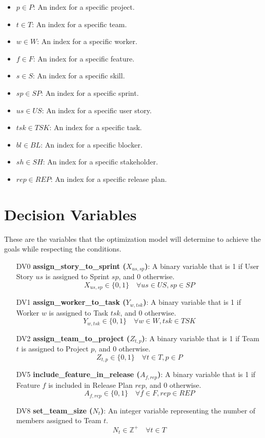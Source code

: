 \documentclass[11pt]{article}
\begin{document}
\begin{itemize}
    \item $p \in P$: An index for a specific project.
    \item $t \in T$: An index for a specific team.
    \item $w \in W$: An index for a specific worker.
    \item $f \in F$: An index for a specific feature.
    \item $s \in S$: An index for a specific skill.
    \item $sp \in SP$: An index for a specific sprint.
    \item $us \in US$: An index for a specific user story.
    \item $tsk \in TSK$: An index for a specific task.
    \item $bl \in BL$: An index for a specific blocker.
    \item $sh \in SH$: An index for a specific stakeholder.
    \item $rep \in REP$: An index for a specific release plan.
\end{itemize}

\section{Decision Variables}
These are the variables that the optimization model will determine to achieve the goals while respecting the conditions.

\begin{itemize}
    \item[DV0] \textbf{assign\_story\_to\_sprint ($X_{us,sp}$)}: A binary variable that is 1 if User Story $us$ is assigned to Sprint $sp$, and 0 otherwise.
    $$ X_{us,sp} \in \{0, 1\} \quad \forall us \in US, sp \in SP $$
    \item[DV1] \textbf{assign\_worker\_to\_task ($Y_{w,tsk}$)}: A binary variable that is 1 if Worker $w$ is assigned to Task $tsk$, and 0 otherwise.
    $$ Y_{w,tsk} \in \{0, 1\} \quad \forall w \in W, tsk \in TSK $$
    \item[DV2] \textbf{assign\_team\_to\_project ($Z_{t,p}$)}: A binary variable that is 1 if Team $t$ is assigned to Project $p$, and 0 otherwise.
    $$ Z_{t,p} \in \{0, 1\} \quad \forall t \in T, p \in P $$
    \item[DV5] \textbf{include\_feature\_in\_release ($A_{f,rep}$)}: A binary variable that is 1 if Feature $f$ is included in Release Plan $rep$, and 0 otherwise.
    $$ A_{f,rep} \in \{0, 1\} \quad \forall f \in F, rep \in REP $$
    \item[DV8] \textbf{set\_team\_size ($N_t$)}: An integer variable representing the number of members assigned to Team $t$.
    $$ N_t \in \mathbb{Z}^+ \quad \forall t \in T $$
\end{itemize}
\end{document}
